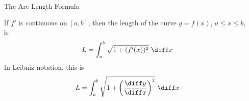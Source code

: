 \begin{frame}
The Arc Length Formula

If $f'$ is continuous on $[a,b]$, then the length of the curve $y = f(x)$, $a\leq x \leq b$, is
\[
L = \int_a^b \sqrt{1 +(f'(x))^2} \ \diff x
\]
In Leibniz notation, this is
\[
L = \int_a^b \sqrt{1 + \left( \frac{\diff y}{\diff x}\right)^2} \ \diff x
\]
\end{frame}
